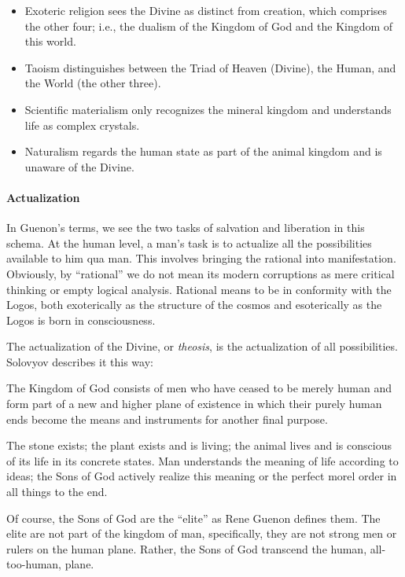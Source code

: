 \begin{itemize}


\item Exoteric religion sees the Divine as distinct from creation, which comprises the other four; i.e., the dualism of the Kingdom of God and the Kingdom of this world.

\item Taoism distinguishes between the Triad of Heaven (Divine), the Human, and the World (the other three).

\item Scientific materialism only recognizes the mineral kingdom and understands life as complex crystals.

\item Naturalism regards the human state as part of the animal kingdom and is unaware of the Divine.
\end{itemize}


\paragraph{Actualization}


In Guenon's terms, we see the two tasks of salvation and liberation in this schema. At the human level, a man's task is to actualize all the possibilities available to him qua man. This involves bringing the rational into manifestation. Obviously, by ``rational'' we do not mean its modern corruptions as mere critical thinking or empty logical analysis. Rational means to be in conformity with the Logos, both exoterically as the structure of the cosmos and esoterically as the Logos is born in consciousness.

The actualization of the Divine, or \emph{theosis}, is the actualization of all possibilities. Solovyov describes it this way:

\begin{quotex}
The Kingdom of God consists of men who have ceased to be merely human and form part of a new and higher plane of existence in which their purely human ends become the means and instruments for another final purpose.

The stone exists; the plant exists and is living; the animal lives and is conscious of its life in its concrete states. Man understands the meaning of life according to ideas; the Sons of God actively realize this meaning or the perfect morel order in all things to the end.
\end{quotex}


Of course, the Sons of God are the ``elite'' as Rene Guenon defines them. The elite are not part of the kingdom of man, specifically, they are not strong men or rulers on the human plane. Rather, the Sons of God transcend the human, all-too-human, plane.

